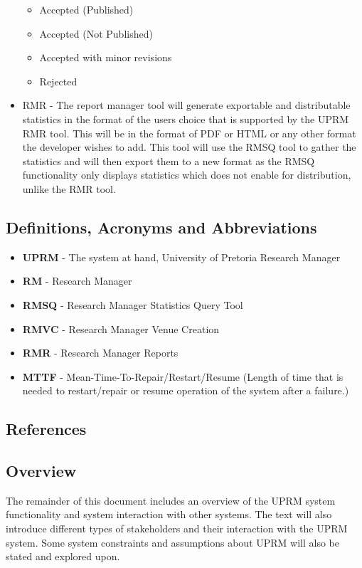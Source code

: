 \begin{paragraph}{}
\begin{itemize}
						\begin{itemize}
							\item Accepted (Published)
							\item Accepted (Not Published)
							\item Accepted with minor revisions
							\item Rejected
						\end{itemize}
					\item RMR -
						The report manager tool will generate exportable and distributable statistics in the format of the users choice that is supported by the UPRM RMR tool. This will be in the format of PDF or HTML or any other format the developer wishes to add. This tool will use the RMSQ tool to gather the statistics and will then export them to a new format as the RMSQ functionality only displays statistics which does not enable for distribution, unlike the RMR tool.
				\end{itemize}
		\end{paragraph}

	\subsection{Definitions, Acronyms and Abbreviations}
		\begin{itemize}
			\item{\textbf{UPRM}} - The system at hand, University of Pretoria Research Manager
			\item{\textbf{RM}} - Research Manager 
			\item{\textbf{RMSQ}} - Research Manager Statistics Query Tool
			\item{\textbf{RMVC}} - Research Manager Venue Creation
			\item{\textbf{RMR}} - Research Manager Reports
			\item{\textbf{MTTF}} - Mean-Time-To-Repair/Restart/Resume (Length of time that is needed to restart/repair or resume operation of the system after a failure.) 
			
		\end{itemize}
	\subsection{References}
	\nocite{*}
	
	

	\subsection{Overview}
	The remainder of this document includes an overview of the UPRM system functionality and system interaction with other systems. The text will also introduce different types of stakeholders and their interaction with the UPRM system. Some system constraints and assumptions about UPRM will also be stated and explored upon.